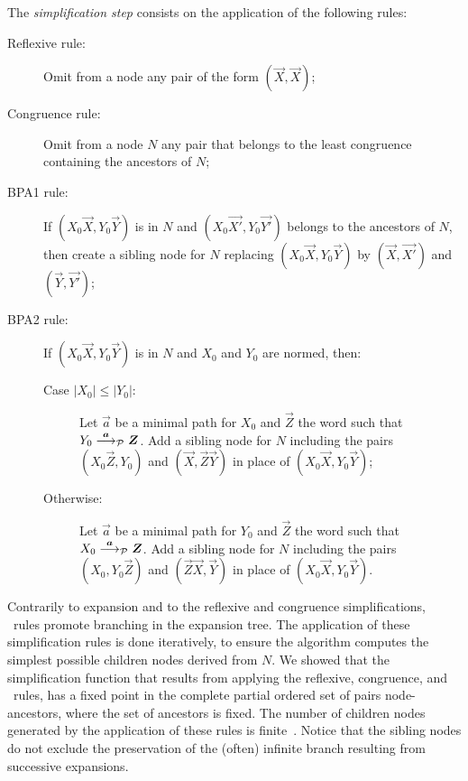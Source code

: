 The \emph{simplification step} consists on the application of the
following rules:
%
\begin{description}
\item[Reflexive rule:] Omit from a node any pair of the form
  $(\vec X,\vec X)$;
\item[Congruence rule:] Omit from a node $N$ any pair that belongs to
  the least congruence containing the ancestors of $N$;
\item[BPA1 rule:] If $(X_0 \vec X, Y_0 \vec Y)$ is in
  $N$ and $(X_0 \vec {X'}, Y_0 \vec {Y'})$ belongs to the ancestors of
  $N$, then create a sibling node for $N$ replacing
  $(X_0 \vec X, Y_0 \vec Y)$ by $(\vec X, \vec {X'})$ and
  $(\vec Y, \vec {Y'})$;
\item[BPA2 rule:] If $(X_0 \vec X, Y_0 \vec Y)$ is in $N$
  and $X_0$ and $Y_0$ are normed, then:
  \begin{description}
  \item[Case $|X_0| \leq |Y_0|$:] Let $\vec a$ be a minimal path
    for $X_0$ and $\vec Z$ the word such that
    $ Y_0 \LTSderivesP[\vec a] \vec Z$. Add a sibling node for
    $N$ including the pairs $(X_0 \vec Z, Y_0)$ and
    $(\vec X, \vec Z \vec Y)$ in place of $(X_0 \vec X, Y_0 \vec Y)$;
  \item[Otherwise:] Let $\vec a$ be a minimal path for 
    $Y_0$ and $\vec Z$ the word such that
    $ X_0 \LTSderivesP[\vec a] \vec Z$. Add a sibling node for $N$
    including the pairs $(X_0 , Y_0 \vec Z )$ and
    $(\vec Z\vec X, \vec Y)$ in place of $(X_0 \vec X, Y_0 \vec Y)$.
  \end{description}
\end{description}

Contrarily to expansion and to the reflexive and congruence
simplifications, \BPA\ rules promote branching in the expansion tree.
The application of these simplification rules is done iteratively, to
ensure the algorithm computes the simplest possible children nodes
derived from $N$. We showed that the simplification function that
results from applying the reflexive, congruence, and \BPA\ rules, has
a fixed point in the complete partial ordered set of pairs
node-ancestors, where the set of ancestors is fixed.  The number of
children nodes generated by the application of these rules is
finite~\cite{DBLP:journals/iandc/ChristensenHS95,janvcar1999techniques}.
%
Notice that the sibling nodes do not exclude the
preservation of the (often) infinite
branch resulting from successive expansions.

